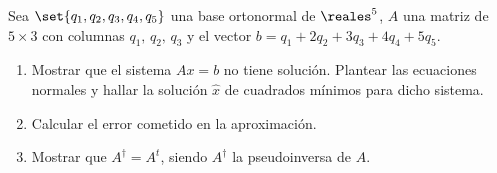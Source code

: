 \begin{enunciado}{\ejExtra}
  Sea $\set{q_1, q_2, q_3, q_4, q_5}$ una base ortonormal de $\reales^5$, $A$ una matriz de $5 \times 3$
  con columnas $q_1,\, q_2,\, q_3$ y el vector $b = q_1 + 2q_2 + 3q_3 + 4q_4 + 5q_5$.

  \begin{enumerate}[label=(\alph*)]
    \item Mostrar que el sistema $Ax = b$ no tiene solución. Plantear las ecuaciones normales y hallar la solución $\hat{x}$ de cuadrados
          mínimos para dicho sistema.

    \item Calcular el error cometido en la aproximación.

    \item Mostrar que $A^\dagger = A^t$, siendo $A^\dagger$ la pseudoinversa de $A$.
  \end{enumerate}
\end{enunciado}

